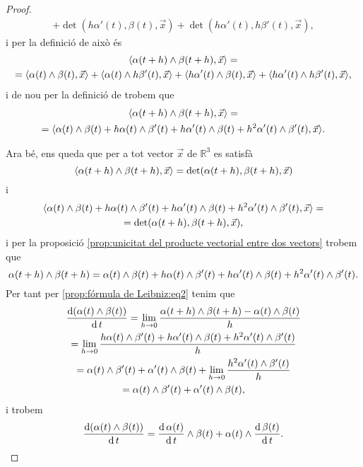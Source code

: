 \documentclass[../../Main.tex]{subfiles}
\begin{document}
\begin{proposition}
\begin{proof}
\begin{multline*}
				+\det(h\alpha'(t),\beta(t),\vec{x})+\det(h\alpha'(t),h\beta'(t),\vec{x}),
			\end{multline*}
			i per la definició de  això és
			\begin{multline*}
				\prodesc{\alpha(t+h)\prodvec\beta(t+h)}{\vec{x}}=\\
				=\prodesc{\alpha(t)\prodvec\beta(t)}{\vec{x}}+\prodesc{\alpha(t)\prodvec h\beta'(t)}{\vec{x}}+\prodesc{h\alpha'(t)\prodvec\beta(t)}{\vec{x}}+\prodesc{h\alpha'(t)\prodvec h\beta'(t)}{\vec{x}},
			\end{multline*}
			i de nou per la definició de  trobem que
			\begin{multline*}
				\prodesc{\alpha(t+h)\prodvec\beta(t+h)}{\vec{x}}=\\
				=\prodesc{\alpha(t)\prodvec\beta(t)+h\alpha(t)\prodvec\beta'(t)+h\alpha'(t)\prodvec\beta(t)+h^{2}\alpha'(t)\prodvec \beta'(t)}{\vec{x}}.
			\end{multline*}
			
			Ara bé, ens queda que per a tot vector \(\vec{x}\) de \(\mathbb{R}^{3}\) es satisfà
			\[\prodesc{\alpha(t+h)\prodvec\beta(t+h)}{\vec{x}}=\det(\alpha(t+h),\beta(t+h),\vec{x})\]
			i
			\begin{multline*}
				\prodesc{\alpha(t)\prodvec\beta(t)+h\alpha(t)\prodvec\beta'(t)+h\alpha'(t)\prodvec\beta(t)+h^{2}\alpha'(t)\prodvec \beta'(t)}{\vec{x}}=\\=\det(\alpha(t+h),\beta(t+h),\vec{x}),
			\end{multline*}
			i per la proposició \ref{prop:unicitat del producte vectorial entre dos vectors} trobem que
			\[\alpha(t+h)\mathbin{\wedge}\beta(t+h)=\alpha(t)\mathbin{\wedge}\beta(t)+h\alpha(t)\mathbin{\wedge}\beta'(t)+h\alpha'(t)\mathbin{\wedge}\beta(t)+h^{2}\alpha'(t)\mathbin{\wedge} \beta'(t).\]
			Per tant per \eqref{prop:fórmula de Leibniz:eq2} tenim que
			\begin{multline*}
				\frac{\operatorname{d}(\alpha(t)\mathbin{\wedge}\beta(t))}{\operatorname{d} t}=\lim_{h\to0}\frac{\alpha(t+h)\mathbin{\wedge}\beta(t+h)-\alpha(t)\mathbin{\wedge}\beta(t)}{h}\\
				=\lim_{h\to0}\frac{h\alpha(t)\mathbin{\wedge}\beta'(t)+h\alpha'(t)\mathbin{\wedge}\beta(t)+h^{2}\alpha'(t)\mathbin{\wedge} \beta'(t)}{h}\\
				=\alpha(t)\mathbin{\wedge}\beta'(t)+\alpha'(t)\mathbin{\wedge}\beta(t)+\lim_{h\to0}\frac{h^{2}\alpha'(t)\mathbin{\wedge} \beta'(t)}{h}\\
				=\alpha(t)\mathbin{\wedge}\beta'(t)+\alpha'(t)\mathbin{\wedge}\beta(t),
			\end{multline*}
			i trobem
			\[\frac{\operatorname{d}(\alpha(t)\mathbin{\wedge}\beta(t))}{\operatorname{d} t}=\frac{\operatorname{d}\alpha(t)}{\operatorname{d} t}\mathbin{\wedge}\beta(t)+\alpha(t)\mathbin{\wedge}\frac{\operatorname{d}\beta(t)}{\operatorname{d} t}.\qedhere\]
		\end{proof}
	\end{proposition}
\end{document}
